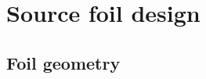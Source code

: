 \documentclass[main.tex]{subfiles}
\begin{document}
\bigskip


\section{Source foil design}\label{sec:SourceFoilDesign}








\subsection{Foil geometry}
\end{document}
